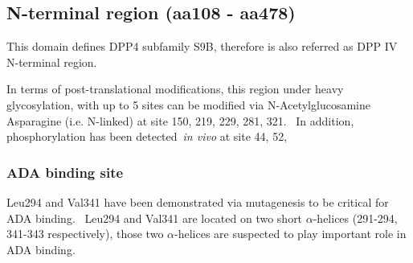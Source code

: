 \subsection{N-terminal region (aa108 - aa478)}

This domain defines DPP4 subfamily S9B, therefore is also referred as DPP IV N-terminal region. 

In terms of post-translational modifications, this region under heavy glycosylation, with up to 5 sites can be modified via N-Acetylglucosamine Asparagine (i.e. N-linked) at site 150, 219, 229, 281, 321.~\cite{Rasmussen2003,Thoma2003,Meng2010,Chen2009,Hiramatsu2003} In addition, phosphorylation has been detected~\textit{in vivo} at site 44, 52,  

\subsubsection{ADA binding site}
Leu294 and Val341 have been demonstrated via mutagenesis to be critical for ADA binding.~\cite{Abbott_1999} Leu294 and Val341 are located on two short $\alpha$-helices (291-294, 341-343 respectively), those two $\alpha$-helices are suspected to play important role in ADA binding. 